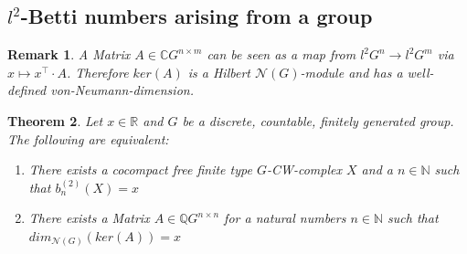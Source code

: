 \documentclass[12pt,a4paper]{scrartcl}
\newtheorem{Theorem}{Theorem}[section]
\newtheorem{Remark}[Theorem]{Remark}
\numberwithin{equation}{section}
\newcommand{\C}{\mathbb{C}} %
\newcommand{\R}{\mathbb{R}} %
\newcommand{\Q}{\mathbb{Q}} %
\newcommand{\N}{\mathbb{N}} %
\newcommand{\2}{\mathbb{Z} / 2 \mathbb{Z}}
\newcommand{\1}{\bar{1}}
\newcommand{\0}{\bar{0}}
\begin{document}
\subsection{$l^2$-Betti numbers arising from a group}
\begin{Remark}\label{MAB}
	A Matrix $A \in \C G^{n \times m}$ can be seen as a map from $l^2G^n \to l^2G^m$ via $x \mapsto x^{\top} \cdot A$. Therefore $ker(A)$ is a Hilbert $\mathcal{N}(G)$-module and has a well-defined von-Neumann-dimension. 
\end{Remark}
\begin{Theorem} \label{MCW}
	Let $x \in \R$ and $G$ be a discrete, countable, finitely generated group. The following are equivalent:
	\begin{enumerate}
		\item There exists a cocompact free finite type $G$-CW-complex $X$ and a $n \in \N$ such that $b_n^{(2)}(X)=x$
		\item There exists a Matrix $A \in \Q G^{n \times n}$ for a natural numbers $n \in \N$ such that \newline $dim_{\mathcal{N}(G)}(ker (A))=x$
	\end{enumerate}
\end{Theorem}
\end{document}
